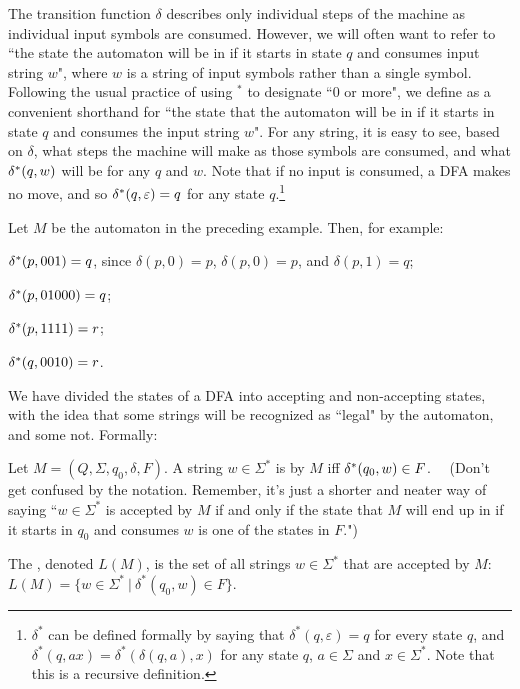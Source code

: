 The transition function $\delta$ describes only individual steps of the machine
as individual input symbols are consumed.  However, we will often want to refer
to
``the
state the automaton will be in if it starts in state $q$ and consumes input
string $w$", where $w$ is a string of input symbols rather than a single symbol.
Following the usual practice of using $^*$ to designate
``0 or more", we define  as a convenient shorthand for 
``the state that the automaton will be in
if it starts in state $q$ and consumes the input string $w$". For any string,
it is easy to see, based on $\delta$, what steps the machine will
make as those symbols are consumed, and what $\delta^*(q,w)$ will be for any $q$
and $w$. Note that if no input is consumed, a DFA makes no move, and so
$\delta^*(q, \varepsilon) = q$ for any state $q$.\footnote{$\delta^*$ can be defined
formally by saying that $\delta^*(q,\varepsilon)=q$ for every state $q$,
and $\delta^*(q,ax)=\delta^*(\delta(q,a),x)$ for any state $q$, $a\in\Sigma$
and $x\in\Sigma^*$.  Note that this is a recursive definition.}

\smallskip

\begin{example}
Let $M$ be the automaton in the preceding example.  Then, for example:

$\delta^*(p, 001)=q$, since $\delta(p,0)=p$, $\delta(p,0)=p$, and $\delta(p,1)=q$; 

$\delta^*(p, 01000)= q$;

$\delta^*(p, 1111) = r$;

$\delta^*(q, 0010) = r$.
\end{example}

\smallskip

We have divided the states of a DFA into accepting and non-accepting states, with
the idea that some strings will be recognized as ``legal" by the automaton, and
some not.  Formally:

\begin{definition}
Let $M=(Q, \Sigma, q_0, \delta, F)$.  A string $w \in \Sigma^*$ is 
by $M$ iff $\delta^*(q_0, w) \in F$. \ \ (Don't get confused by the notation.  
Remember, it's just a shorter and neater way of saying
``$w \in \Sigma^*$ is accepted by $M$ if and only if the state that $M$ will end
up in
if it starts in $q_0$ and consumes $w$ is one of the states in $F$.")

The , denoted $L(M)$, is the set of all strings 
$w \in \Sigma^*$ that are accepted by $M$: 
$L(M) = \{ w \in\Sigma^* \ | \ \delta^*(q_0, w) \in F\}$.

\end{definition}

